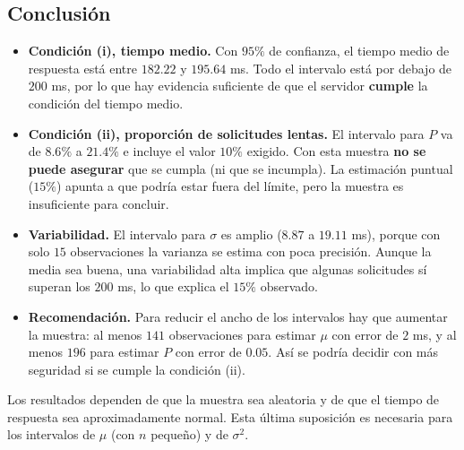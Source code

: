 \documentclass[10pt,letterpaper]{article}
\begin{document}
\subsection{Conclusión}

\begin{itemize}
    \item \textbf{Condición (i), tiempo medio.} Con $95\%$ de confianza, el tiempo medio de respuesta está entre $182.22$ y $195.64$ ms. Todo el intervalo está por debajo de $200$ ms, por lo que hay evidencia suficiente de que el servidor \textbf{cumple} la condición del tiempo medio.
    \item \textbf{Condición (ii), proporción de solicitudes lentas.} El intervalo para $P$ va de $8.6\%$ a $21.4\%$ e incluye el valor $10\%$ exigido. Con esta muestra \textbf{no se puede asegurar} que se cumpla (ni que se incumpla). La estimación puntual ($15\%$) apunta a que podría estar fuera del límite, pero la muestra es insuficiente para concluir.
    \item \textbf{Variabilidad.} El intervalo para $\sigma$ es amplio ($8.87$ a $19.11$ ms), porque con solo $15$ observaciones la varianza se estima con poca precisión. Aunque la media sea buena, una variabilidad alta implica que algunas solicitudes sí superan los $200$ ms, lo que explica el $15\%$ observado.
    \item \textbf{Recomendación.} Para reducir el ancho de los intervalos hay que aumentar la muestra: al menos $141$ observaciones para estimar $\mu$ con error de $2$ ms, y al menos $196$ para estimar $P$ con error de $0.05$. Así se podría decidir con más seguridad si se cumple la condición (ii).
\end{itemize}

Los resultados dependen de que la muestra sea aleatoria y de que el tiempo de respuesta sea aproximadamente normal. Esta última suposición es necesaria para los intervalos de $\mu$ (con $n$ pequeño) y de $\sigma^2$.
\end{document}
